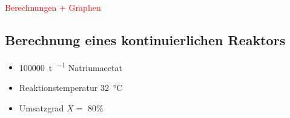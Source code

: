 \renewcommand{\arraystretch}{1.2}
\begin{table}[h!]
	\centering
	\caption{Ideale Umsatzgrade aus E(t) und $X_{\text{analytisch}}$}
	\label{tab:usg_real}
\end{table}
\FloatBarrier
\vspace*{-2.5mm}
\textcolor{red}{Berechnungen + Graphen}



\subsection{Berechnung eines kontinuierlichen Reaktors}
\begin{itemize}
	\item \SI{100 000}{\tonne\per\year} Natriumacetat
	\item Reaktionstemperatur \SI{32}{\degreeCelsius}
	\item Umsatzgrad $X=$ 80\%
\end{itemize}
